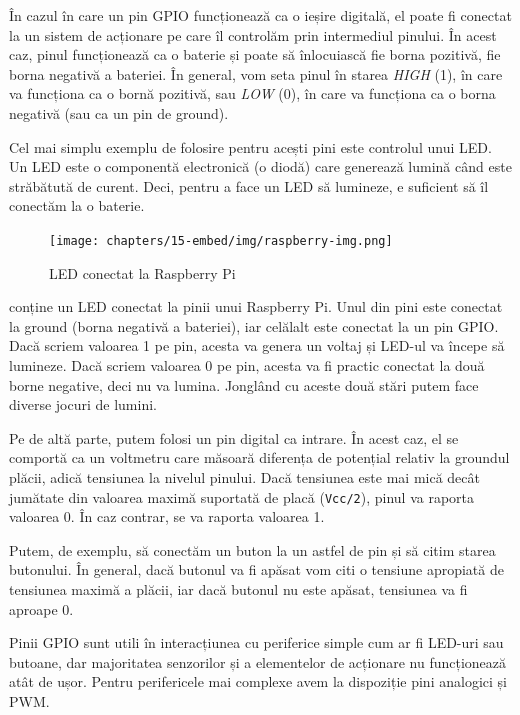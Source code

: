 În cazul în care un pin GPIO funcționează ca o ieșire digitală, el poate fi
conectat la un sistem de acționare pe care îl controlăm prin intermediul
pinului. În acest caz, pinul funcționează ca o baterie și poate să înlocuiască
fie borna pozitivă, fie borna negativă a bateriei. În general, vom seta pinul în
starea \textit{HIGH} (1), în care va funcționa ca o bornă pozitivă, sau \textit{LOW} (0), în care
va funcționa ca o borna negativă (sau ca un pin de ground).

Cel mai simplu exemplu de folosire pentru acești pini este controlul unui LED.
Un LED este o componentă electronică (o diodă) care generează lumină când este
străbătută de curent. Deci, pentru a face un LED să lumineze, e suficient să îl
conectăm la o baterie.

\begin{figure}[!htbp]
  \centering
  \texttt{[image: chapters/15-embed/img/raspberry-img.png]}
  \caption{LED conectat la Raspberry Pi}
  \label{fig:embed:raspberry}
\end{figure}

 conține un LED conectat la pinii
unui Raspberry Pi. Unul din pini este conectat la ground (borna negativă a
bateriei), iar celălalt este conectat la un pin GPIO. Dacă scriem valoarea 1 pe
pin, acesta va genera un voltaj și LED-ul va începe să lumineze. Dacă scriem
valoarea 0 pe pin, acesta va fi practic conectat la două borne negative, deci nu
va lumina. Jonglând cu aceste două stări putem face diverse jocuri de lumini.

Pe de altă parte, putem folosi un pin digital ca intrare. În acest caz, el se
comportă ca un voltmetru care măsoară diferența de potențial relativ la
groundul plăcii, adică tensiunea la nivelul pinului. Dacă tensiunea este mai
mică decât jumătate din valoarea maximă suportată de placă (\texttt{Vcc/2}), pinul va
raporta valoarea 0. În caz contrar, se va raporta valoarea 1.

Putem, de exemplu, să conectăm un buton la un astfel de pin și să citim starea
butonului. În general, dacă butonul va fi apăsat vom citi o tensiune apropiată
de tensiunea maximă a plăcii, iar dacă butonul nu este apăsat, tensiunea va fi
aproape 0.

Pinii GPIO sunt utili în interacțiunea cu periferice simple cum ar fi LED-uri
sau butoane, dar majoritatea senzorilor și a elementelor de acționare nu
funcționează atât de ușor. Pentru perifericele mai complexe avem la dispoziție
pini analogici și PWM.


